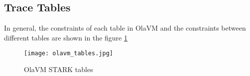\subsection{Trace Tables} \label{sec:trace-tables}

In general, the constraints of each table in OlaVM and the constraints between different tables are shown in the figure \ref{fig:OlaVM-STARK-tables}

\begin{figure}[!ht]
    \centering
    \texttt{[image: olavm\_tables.jpg]}
    \caption{OlaVM STARK tables}
    \label{fig:OlaVM-STARK-tables}
\end{figure}



